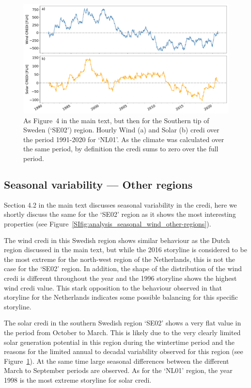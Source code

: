 \documentclass[12pt]{iopart}
\newcommand{\credi}[0]{{\sc credi}}
\newcommand{\sdi}[0]{{\sc solar credi}}
\newcommand{\wdi}[0]{{\sc wind credi}}
\begin{document}
\begin{figure}[ht]
    \centering
    \includegraphics[width=\textwidth]{additional_regions/CREDI_interannual_SE02.pdf}
    \caption{
        As Figure~4 in the main text, but then for the Southern tip of Sweden (`SE02') region. 
        Hourly Wind (a) and Solar (b) \credi{} over the period 1991-2020 for `NL01'. 
        As the climate was calculated over the same period, by definition the \credi{} sums to zero over the full period.}
    \label{SIfig:analysis_decadal_other-regions_B}
\end{figure}

\newpage
\subsection{Seasonal variability --- Other regions}
Section 4.2 in the main text discusses seasonal variability in the \credi{}, here we shortly discuss the same for the `SE02' region as it shows the most interesting properties (see Figure~\ref{SIfig:analysis_seasonal_wind_other-regions}). 

The \wdi{} in this Swedish region shows similar behaviour as the Dutch region discussed in the main text, but while the 2016 storyline is considered to be the most extreme for the north-west region of the Netherlands, this is not the case for the `SE02' region. 
In addition, the shape of the distribution of the \wdi{} is different throughout the year and the 1996 storyline shows the highest \wdi{} value. 
This stark opposition to the behaviour observed in that storyline for the Netherlands indicates some possible balancing for this specific storyline.

The \sdi{} in the southern Swedish region `SE02' shows a very flat value in the period from October to March. 
This is likely due to the very clearly limited solar generation potential in this region during the wintertime period and the reasons for the limited annual to decadal variability observed for this region (see Figure~\ref{SIfig:analysis_decadal_other-regions_B}). 
At the same time large seasonal differences between the different March to September periods are observed. 
As for the `NL01' region, the year 1998 is the most extreme storyline for \sdi.
\end{document}
